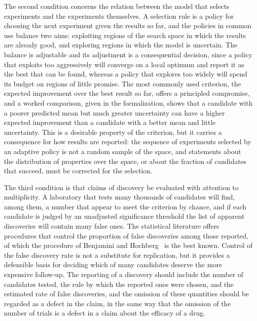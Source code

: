 The second condition concerns the relation between the model that selects experiments and the experiments themselves. A selection rule is a policy for choosing the next experiment given the results so far, and the policies in common use balance two aims: exploiting regions of the search space in which the results are already good, and exploring regions in which the model is uncertain. The balance is adjustable and its adjustment is a consequential decision, since a policy that exploits too aggressively will converge on a local optimum and report it as the best that can be found, whereas a policy that explores too widely will spend its budget on regions of little promise. The most commonly used criterion, the expected improvement over the best result so far, offers a principled compromise, and a worked comparison, given in the formalization, shows that a candidate with a poorer predicted mean but much greater uncertainty can have a higher expected improvement than a candidate with a better mean and little uncertainty. This is a desirable property of the criterion, but it carries a consequence for how results are reported: the sequence of experiments selected by an adaptive policy is not a random sample of the space, and statements about the distribution of properties over the space, or about the fraction of candidates that succeed, must be corrected for the selection.

The third condition is that claims of discovery be evaluated with attention to multiplicity. A laboratory that tests many thousands of candidates will find, among them, a number that appear to meet the criterion by chance, and if each candidate is judged by an unadjusted significance threshold the list of apparent discoveries will contain many false ones. The statistical literature offers procedures that control the proportion of false discoveries among those reported, of which the procedure of Benjamini and Hochberg~\cite{benjamini1995} is the best known. Control of the false discovery rate is not a substitute for replication, but it provides a defensible basis for deciding which of many candidates deserve the more expensive follow-up. The reporting of a discovery should include the number of candidates tested, the rule by which the reported ones were chosen, and the estimated rate of false discoveries, and the omission of these quantities should be regarded as a defect in the claim, in the same way that the omission of the number of trials is a defect in a claim about the efficacy of a drug.

